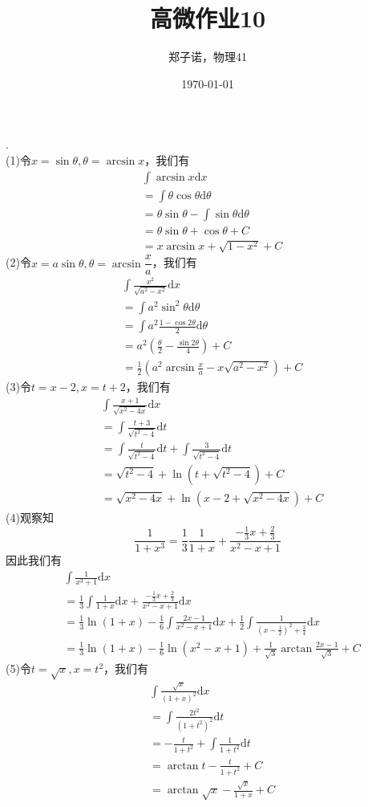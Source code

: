 \documentclass[utf8]{ctexart}
\title{高微作业10}
\author{郑子诺，物理41}
\date{\today}
\begin{document}
\maketitle
{}.\\
(1)令$x=\sin\theta,\theta=\arcsin x$，我们有
\begin{align*}
	&\int\arcsin x\mathrm{d}x\\
	&=\int\theta\cos\theta\mathrm{d}\theta\\
	&=\theta\sin\theta-\int\sin\theta\mathrm{d}\theta\\
	&=\theta\sin\theta+\cos\theta+C\\
	&=x\arcsin x+\sqrt{1-x^2}+C
\end{align*}
(2)令$x=a\sin\theta,\theta=\arcsin\dfrac{x}{a}$，我们有
\begin{align*}
	&\int\frac{x^2}{\sqrt{a^2-x^2}}\mathrm{d}x\\
	&=\int a^2\sin^2\theta\mathrm{d}\theta\\
	&=\int a^2\frac{1-\cos2\theta}{2}\mathrm{d}\theta\\
	&=a^2(\frac{\theta}{2}-\frac{\sin2\theta}{4})+C\\
	&=\frac{1}{2}(a^2\arcsin \frac{x}{a}-x\sqrt{a^2-x^2})+C
\end{align*}
(3)令$t=x-2,x=t+2$，我们有
\begin{align*}
	&\int\frac{x+1}{\sqrt{x^2-4x}}\mathrm{d}x\\
	&=\int\frac{t+3}{\sqrt{t^2-4}}\mathrm{d}t\\
	&=\int\frac{t}{\sqrt{t^2-4}}\mathrm{d}t+\int\frac{3}{\sqrt{t^2-4}}\mathrm{d}t\\
	&=\sqrt{t^2-4}+\ln(t+\sqrt{t^2-4})+C\\
	&=\sqrt{x^2-4x}+\ln(x-2+\sqrt{x^2-4x})+C
\end{align*}
(4)观察知
\[\frac{1}{1+x^3}=\frac{1}{3}\frac{1}{1+x}+\frac{-\frac{1}{3}x+\frac{2}{3}}{x^2-x+1}\]
因此我们有
\begin{align*}
	&\int\frac{1}{x^3+1}\mathrm{d}x\\
	&=\frac{1}{3}\int\frac{1}{1+x}\mathrm{d}x+\frac{-\frac{1}{3}x+\frac{2}{3}}{x^2-x+1}\mathrm{d}x\\
	&=\frac{1}{3}\ln(1+x)-\frac{1}{6}\int\frac{2x-1}{x^2-x+1}\mathrm{d}x+\frac{1}{2}\int\frac{1}{(x-\frac{1}{2})^2+\frac{3}{4}}\mathrm{d}x\\
	&=\frac{1}{3}\ln(1+x)-\frac{1}{6}\ln(x^2-x+1)+\frac{1}{\sqrt{3}}\arctan\frac{2x-1}{\sqrt{3}}+C
\end{align*}
(5)令$t=\sqrt{x},x=t^2$，我们有
\begin{align*}
	&\int\frac{\sqrt{x}}{(1+x)^2}\mathrm{d}x\\
	&=\int\frac{2t^2}{(1+t^2)^2}\mathrm{d}t\\
	&=-\frac{t}{1+t^2}+\int\frac{1}{1+t^2}\mathrm{d}t\\
	&=\arctan t-\frac{t}{1+t^2}+C\\
	&=\arctan\sqrt{x}-\frac{\sqrt{x}}{1+x}+C
\end{align*}
\end{document}

